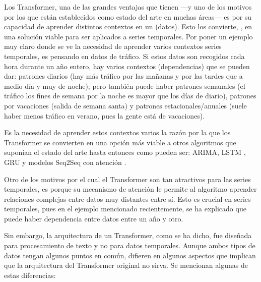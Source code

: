 Los Transformer, una de las grandes ventajas que tienen ---y uno de los motivos por los que están establecidos como estado del arte en muchas áreas--- es por su capacidad de aprender distintos contextos en un  (datos). Esto los convierte, , en una solución viable para ser aplicados a series temporales. Por poner un ejemplo muy claro donde se ve la necesidad de aprender varios contextos series temporales, es pensando en datos de tráfico. Si estos datos son recogidos cada hora durante un año entero, hay varios contextos (dependencias) que se pueden dar: patrones diarios (hay más tráfico por las mañanas y por las tardes que a medio día y muy de noche); pero también puede haber patrones semanales (el tráfico los fines de semana por la noche es mayor que los días de diario), patrones por vacaciones (salida de semana santa) y patrones estacionales/anuales (suele haber menos tráfico en verano, pues la gente está de vacaciones). 

Es la necesidad de aprender estos contextos varios la razón por la que los Transformer se convierten en una opción más viable a otros algoritmos que suponían el estado del arte hasta entonces \parencite{learnablePosB} como pueden ser: ARIMA\parencite{ARIMA}, LSTM \parencite{lstm}, GRU \parencite{gru} y modelos Seq2Seq con atención \parencite{rnnPlusAttention} .

Otro de los motivos por el cual el Transformer son tan atractivos para las series temporales, es porque su mecanismo de atención le permite al algoritmo aprender relaciones complejas entre datos muy distantes entre sí. Esto es crucial en series temporales, pues en el ejemplo mencionado recientemente, se ha explicado que puede haber dependencia entre datos entre un año y otro.

Sin embargo, la arquitectura  de un Transformer, como se ha dicho, fue diseñada para procesamiento de texto y no para datos temporales. Aunque ambos tipos de datos tengan algunos puntos en común, difieren en algunos aspectos que implican que la arquitectura del Transformer original no sirva. Se mencionan algunas de estas diferencias:

